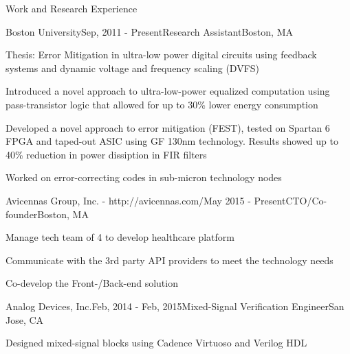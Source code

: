 \begin{rSection} {Work and Research Experience}
  \begin{rSubsection}{Boston University}{Sep, 2011 - Present}{Research Assistant}{Boston, MA}
  \item Thesis: Error Mitigation in ultra-low power digital circuits using feedback systems and dynamic voltage and frequency scaling (DVFS)
  \item Introduced a novel approach to ultra-low-power equalized computation using pass-transistor logic that allowed for up to 30\% lower energy consumption
  \item Developed a novel approach to error mitigation (FEST), tested on Spartan 6 FPGA and taped-out ASIC using GF 130nm technology. Results showed up to 40\% reduction in power dissiption in FIR filters
  \item Worked on error-correcting codes in sub-micron technology nodes
  \end{rSubsection}
  \begin{rSubsection}{Avicennas Group, Inc. - http://avicennas.com/}{May 2015 - Present}{CTO/Co-founder}{Boston, MA}
  \item Manage tech team of 4 to develop healthcare platform
  \item Communicate with the 3rd party API providers to meet the technology needs
  \item Co-develop the Front-/Back-end solution
  \end{rSubsection}
  \begin{rSubsection}{Analog Devices, Inc.}{Feb, 2014 - Feb, 2015}{Mixed-Signal Verification Engineer}{San Jose, CA}
  \item Designed mixed-signal blocks using Cadence Virtuoso and Verilog HDL

\end{rSubsection}
\end{rSection}
